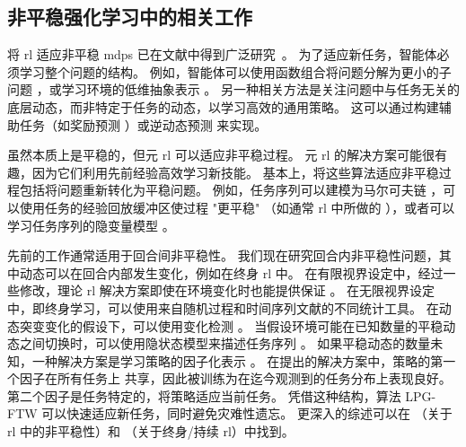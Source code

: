 \subsection{非平稳强化学习中的相关工作}
\label{subsec:related_worls_lifelong}

将 \gls{rl} 适应非平稳 \glspl{mdp} 已在文献中得到广泛研究~\cite{garcia2000solving, ghate2013linear, lesner2015nonstationary}。
为了适应新任务，智能体必须学习整个问题的结构。
例如，智能体可以使用函数组合将问题分解为更小的子问题 \cite{griffiths2019subtasks}，或学习环境的低维抽象表示 \cite{zhang2018decoupling, Francois-Lavet2019abstract}。
另一种相关方法是关注问题中与任务无关的底层动态，而非特定于任务的动态，以学习高效的通用策略。
这可以通过构建辅助任务（如奖励预测 \cite{jaderberg2017rew-pred}）或逆动态预测 \cite{Shelhamer2017dyn-pred} 来实现。

虽然本质上是平稳的，但元 \gls{rl} 可以适应非平稳过程。
元 \gls{rl} 的解决方案可能很有趣，因为它们利用先前经验高效学习新技能。
基本上，将这些算法适应非平稳过程包括将问题重新转化为平稳问题。
例如，任务序列可以建模为马尔可夫链 \cite{al-shedivat2018continuous}，可以使用任务的经验回放缓冲区使过程 "更平稳" \cite{riemer2018learning}（如通常 \gls{rl} 中所做的 \cite{mnih2013playing}），或者可以学习任务序列的隐变量模型 \cite{poiani2021meta}。

先前的工作通常适用于回合间非平稳性。
我们现在研究回合内非平稳性问题，其中动态可以在回合内部发生变化，例如在终身 \gls{rl} 中。
在有限视界设定中，经过一些修改，理论 \gls{rl} 解决方案即使在环境变化时也能提供保证 \cite{hallak2015contextual,ortner2020uclr2}。
在无限视界设定中，即终身学习，可以使用来自随机过程和时间序列文献的不同统计工具。
在动态突变变化的假设下，可以使用变化检测 \cite{daSilva2006context, hadoux2014sequential}。
当假设环境可能在已知数量的平稳动态之间切换时，可以使用隐状态模型来描述任务序列 \cite{choi2000hidden}。
如果平稳动态的数量未知，一种解决方案是学习策略的因子化表示 \cite{mendez2020lifelong}。
在提出的解决方案中，策略的第一个因子在所有任务上
共享，因此被训练为在迄今观测到的任务分布上表现良好。第二个因子是任务特定的，将策略适应当前任务。
凭借这种结构，算法 LPG-FTW 可以快速适应新任务，同时避免灾难性遗忘。
更深入的综述可以在 \cite{padakandla2021survey}（关于 \gls{rl} 中的非平稳性）和 \cite{khetarpal2020towards}（关于终身/持续 \gls{rl}）中找到。

